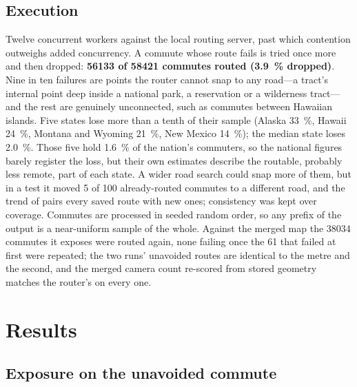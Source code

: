 \documentclass[11pt,twoside]{article}
\begin{document}
\subsection{Execution}
\label{sec:method:exec}

Twelve concurrent workers against the local routing server, past which contention outweighs
added concurrency. A commute whose route fails is tried once more and then dropped: \textbf{\num{56133} of
\num{58421} commutes routed (\SI{3.9}{\percent} dropped)}. Nine in ten failures are points the
router cannot snap to any road---a tract's internal point deep inside a national park, a
reservation or a wilderness tract---and the rest are genuinely unconnected, such as commutes
between Hawaiian islands. Five states lose more than a tenth of their sample (Alaska
\SI{33}{\percent}, Hawaii \SI{24}{\percent}, Montana and Wyoming \SI{21}{\percent}, New
Mexico \SI{14}{\percent}); the median state loses \SI{2.0}{\percent}. Those five hold
\SI{1.6}{\percent} of the nation's commuters, so the national figures barely register the
loss, but their own estimates describe the routable, probably less remote, part of each
state. A wider road search could snap more of them, but in a test it moved 5 of 100
already-routed commutes to a different road, and the trend of  pairs every saved
route with new ones; consistency was kept over coverage. Commutes are processed in seeded
random order, so any prefix of the output is a near-uniform sample of the whole. Against the
merged map the \num{38034} commutes it exposes were routed again, none failing once the 61
that failed at first were repeated; the two runs' unavoided routes are identical to the metre
and the second, and the merged camera count re-scored from stored geometry matches the
router's on every one.

\section{Results}
\label{sec:results}

\subsection{Exposure on the unavoided commute}
\label{sec:results:exposure}
\end{document}
